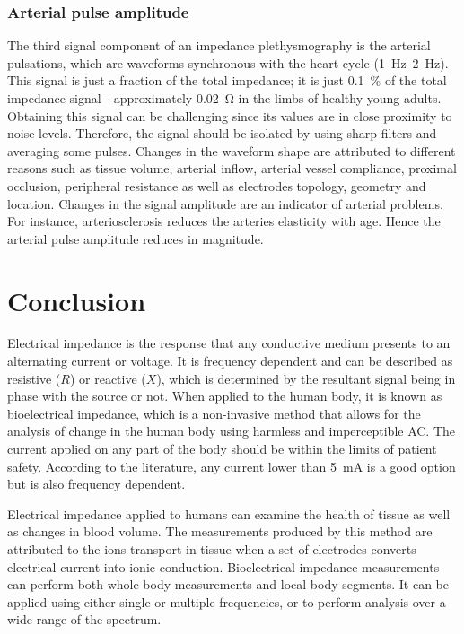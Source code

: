 \subsubsection{Arterial pulse amplitude}
The third signal component of an impedance plethysmography is the arterial pulsations, which are waveforms synchronous with the heart cycle (\SIrange{1}{2}{\hertz}). This signal is just a fraction of the total impedance; it is just \SI{0.1}{\percent} of the total impedance signal - approximately \SI{0.02}{\ohm} in the limbs of healthy young adults. Obtaining this signal can be challenging since its values are in close proximity to noise levels. Therefore, the signal should be isolated by using sharp filters and averaging some pulses. Changes in  the waveform shape are attributed to different reasons such as tissue volume, arterial inflow, arterial vessel compliance, proximal occlusion, peripheral resistance as well as electrodes topology, geometry and location.  Changes in the signal amplitude are an indicator of arterial problems. For instance, arteriosclerosis reduces the arteries elasticity with age. Hence the arterial pulse amplitude reduces in magnitude.

\section{Conclusion}
Electrical impedance is the response that any conductive medium presents to an alternating current or voltage. It is frequency dependent and can be described as resistive ($R$) or reactive ($X$), which is determined by the resultant signal being in phase with the source or not. When applied to the human body, it is known as bioelectrical impedance, which is a non-invasive method that allows for the analysis of change in the human body using harmless and imperceptible AC. The current applied on any part of the body should be within the limits of patient safety. According to the literature, any current  lower than \SI{5}{\mA} is a good option but is also frequency dependent. 

Electrical impedance applied to humans can examine the health of tissue as well as changes in blood volume. The measurements produced by this method are attributed to the ions transport in tissue when a set of electrodes converts electrical current into ionic conduction. Bioelectrical impedance measurements can perform both whole body measurements and local body segments. It can be applied using either single or multiple frequencies, or to perform analysis over a wide range of the spectrum. 

